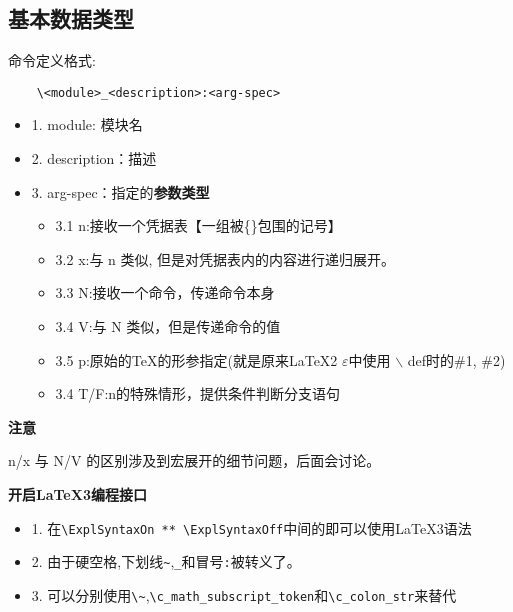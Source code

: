 \documentclass[fontset=windows]{article}
\begin{document}
\subsection{基本数据类型}
命令定义格式:
\begin{verbatim}
    \<module>_<description>:<arg-spec>
\end{verbatim}
\begin{itemize}
    \item 1. module: 模块名
    \item 2. description：描述
    \item 3. arg-spec：指定的{\bf 参数类型}
    \begin{itemize}
        \item 3.1 n:接收一个凭据表【一组被\{\}包围的记号】
        \item 3.2 x:与 n 类似, 但是对凭据表内的内容进行递归展开。
        \item 3.3 N:接收一个命令，传递命令本身
        \item 3.4 V:与 N 类似，但是传递命令的值
        \item 3.5 p:原始的\TeX 的形参指定(就是原来\LaTeX2 $\varepsilon$中使用 $\backslash$ def时的\#1, \#2)
        \item 3.4 T/F:n的特殊情形，提供条件判断分支语句
    \end{itemize}
\end{itemize}

\textbf{注意}\par 
n/x 与 N/V 的区别涉及到宏展开的细节问题，后面会讨论。

\textbf{开启\LaTeX3编程接口}
\begin{itemize}
    \item 1. 在\verb!\ExplSyntaxOn ** \ExplSyntaxOff!中间的即可以使用\LaTeX3语法
    \item 2. 由于硬空格,下划线\verb!~!,\verb!_!和冒号\verb!:!被转义了。
    \item 3. 可以分别使用\verb!\~!,\verb!\c_math_subscript_token!和\verb!\c_colon_str!来替代
\end{itemize}


    
\ExplSyntaxOn
\end{document}
